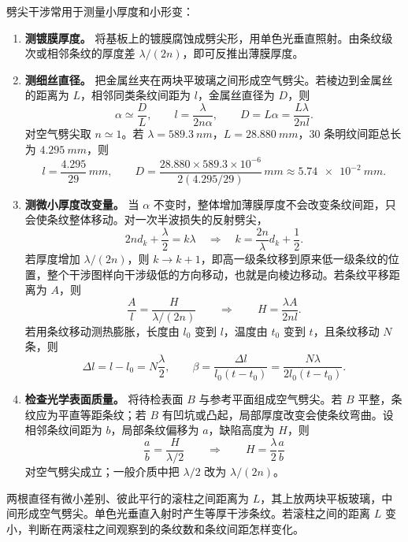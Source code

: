 \begin{conclusion}[劈尖薄膜的干涉]
劈尖干涉常用于测量小厚度和小形变：
\begin{enumerate}
  \item \textbf{测镀膜厚度。} 将基板上的镀膜腐蚀成劈尖形，用单色光垂直照射。由条纹级次或相邻条纹的厚度差 \(\lambda/(2n)\)，即可反推出薄膜厚度。
  \item \textbf{测细丝直径。} 把金属丝夹在两块平玻璃之间形成空气劈尖。若棱边到金属丝的距离为 \(L\)，相邻同类条纹间距为 \(l\)，金属丝直径为 \(D\)，则
  \[
  \alpha\simeq \frac{D}{L},
  \qquad
  l=\frac{\lambda}{2n\alpha},
  \qquad
  D=L\alpha=\frac{L\lambda}{2nl}.
  \]
  对空气劈尖取 \(n\simeq1\)。若 \(\lambda=\SI{589.3}{nm}\)，\(L=\SI{28.880}{mm}\)，30 条明纹间距总长为 \(\SI{4.295}{mm}\)，则
  \[
  l=\frac{4.295}{29}\,\si{mm},
  \qquad
  D=\frac{28.880\times 589.3\times 10^{-6}}{2(4.295/29)}\,\si{mm}
  \approx \SI{5.74e-2}{mm}.
  \]
  \item \textbf{测微小厚度改变量。} 当 \(\alpha\) 不变时，整体增加薄膜厚度不会改变条纹间距，只会使条纹整体移动。对一次半波损失的反射劈尖，
  \[
  2nd_k+\frac{\lambda}{2}=k\lambda
  \quad\Longrightarrow\quad
  k=\frac{2n}{\lambda}d_k+\frac{1}{2}.
  \]
  若厚度增加 \(\lambda/(2n)\)，则 \(k\to k+1\)，即高一级条纹移到原来低一级条纹的位置，整个干涉图样向干涉级低的方向移动，也就是向棱边移动。若条纹平移距离为 \(A\)，则
  \[
  \frac{A}{l}=\frac{H}{\lambda/(2n)}
  \qquad\Longrightarrow\qquad
  H=\frac{\lambda A}{2nl}.
  \]
  若用条纹移动测热膨胀，长度由 \(l_0\) 变到 \(l\)，温度由 \(t_0\) 变到 \(t\)，且条纹移动 \(N\) 条，则
  \[
  \Delta l=l-l_0=N\frac{\lambda}{2},
  \qquad
  \beta=\frac{\Delta l}{l_0(t-t_0)}
  =\frac{N\lambda}{2l_0(t-t_0)}.
  \]
  \item \textbf{检查光学表面质量。} 将待检表面 \(B\) 与参考平面组成空气劈尖。若 \(B\) 平整，条纹应为平直等距条纹；若 \(B\) 有凹坑或凸起，局部厚度改变会使条纹弯曲。设相邻条纹间距为 \(b\)，局部条纹偏移为 \(a\)，缺陷高度为 \(H\)，则
  \[
  \frac{a}{b}=\frac{H}{\lambda/2}
  \qquad\Longrightarrow\qquad
  H=\frac{\lambda}{2}\frac{a}{b}
  \]
  对空气劈尖成立；一般介质中把 \(\lambda/2\) 改为 \(\lambda/(2n)\)。
\end{enumerate}
\end{conclusion}

\begin{exercise}
两根直径有微小差别、彼此平行的滚柱之间距离为 \(L\)，其上放两块平板玻璃，中间形成空气劈尖。单色光垂直入射时产生等厚干涉条纹。若滚柱之间的距离 \(L\) 变小，判断在两滚柱之间观察到的条纹数和条纹间距怎样变化。
\end{exercise}

